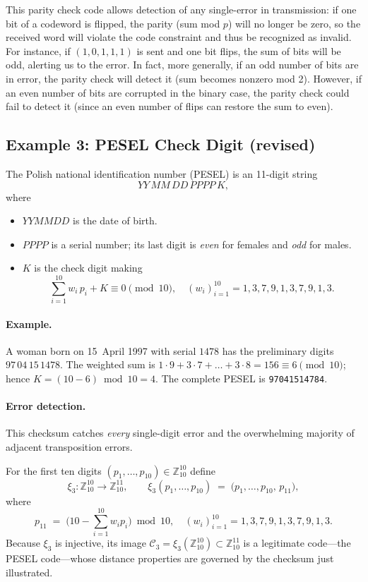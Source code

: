 \documentclass[docmute]{article}
\begin{document}
This parity check code allows detection of any single-error in transmission: if one bit of a codeword is flipped, the parity (sum mod $p$) will no longer be zero, so the received word will violate the code constraint and thus be recognized as invalid. For instance, if $(1,0,1,1,1)$ is sent and one bit flips, the sum of bits will be odd, alerting us to the error. In fact, more generally, if an odd number of bits are in error, the parity check will detect it (sum becomes nonzero mod 2). However, if an even number of bits are corrupted in the binary case, the parity check could fail to detect it (since an even number of flips can restore the sum to even).

\subsection*{Example 3: \textsc{PESEL} Check Digit (revised)}
The Polish national identification number (\textsc{PESEL}) is an
11-digit string
\[
  YY\,MM\,DD\,PPPP\,K,
\]
where
\begin{itemize}
  \item $YYMMDD$ is the date of birth.  
  \item $PPPP$ is a serial number; its last digit is \emph{even} for
        females and \emph{odd} for males.
  \item $K$ is the check digit making
        \[
          \sum_{i=1}^{10} w_i\,p_i + K \equiv 0 \pmod{10},
          \quad
          (w_i)_{i=1}^{10}=1,3,7,9,1,3,7,9,1,3.
        \]
\end{itemize}

\paragraph{Example.}
A woman born on 15~April 1997 with serial $1478$ has the preliminary
digits $97\,04\,15\,1478$.  The weighted sum is
$1\cdot9+3\cdot7+\dots+3\cdot8=156\equiv6\pmod{10}$; hence
$K=(10-6)\bmod10=4$.  The complete PESEL is \texttt{97041514784}.

\paragraph{Error detection.}
This checksum catches \emph{every} single-digit error and the
overwhelming majority of adjacent transposition errors.

For the first ten digits $(p_1,\dots,p_{10})\in\mathbb{Z}_{10}^{10}$
define
\[
  \xi_{3}:\mathbb{Z}_{10}^{10}\longrightarrow\mathbb{Z}_{10}^{11},
  \qquad
  \xi_{3}(p_1,\dots,p_{10})
  \;=\;
  \bigl(p_1,\dots,p_{10},\,p_{11}\bigr),
\]
where
\[
  p_{11}
  \;=\;
  \bigl(10-\!\!\!\sum_{i=1}^{10} w_i p_i\bigr)\bmod10,
  \quad
  (w_i)_{i=1}^{10}=1,3,7,9,1,3,7,9,1,3.
\]
Because $\xi_{3}$ is injective, its image
$\mathcal{C}_3=\xi_{3}(\mathbb{Z}_{10}^{10})\subset\mathbb{Z}_{10}^{11}$
is a legitimate code—the \textsc{PESEL} code—whose distance properties
are governed by the checksum just illustrated.
\end{document}
